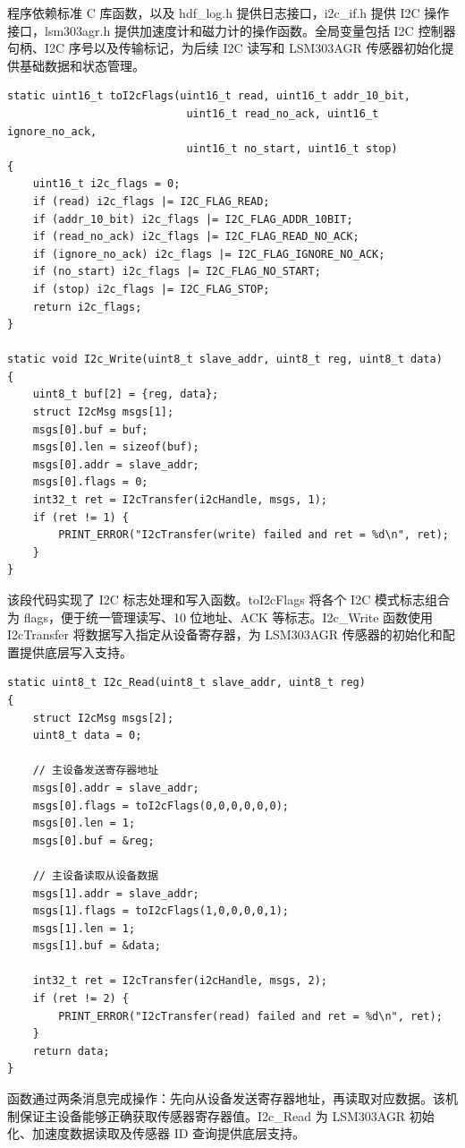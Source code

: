 程序依赖标准 C 库函数，以及 hdf_log.h 提供日志接口，i2c_if.h 提供 I2C 操作接口，lsm303agr.h 提供加速度计和磁力计的操作函数。全局变量包括 I2C 控制器句柄、I2C 序号以及传输标记，为后续 I2C 读写和 LSM303AGR 传感器初始化提供基础数据和状态管理。

\begin{lstlisting}
static uint16_t toI2cFlags(uint16_t read, uint16_t addr_10_bit,
                            uint16_t read_no_ack, uint16_t ignore_no_ack,
                            uint16_t no_start, uint16_t stop)
{
    uint16_t i2c_flags = 0;
    if (read) i2c_flags |= I2C_FLAG_READ;
    if (addr_10_bit) i2c_flags |= I2C_FLAG_ADDR_10BIT;
    if (read_no_ack) i2c_flags |= I2C_FLAG_READ_NO_ACK;
    if (ignore_no_ack) i2c_flags |= I2C_FLAG_IGNORE_NO_ACK;
    if (no_start) i2c_flags |= I2C_FLAG_NO_START;
    if (stop) i2c_flags |= I2C_FLAG_STOP;
    return i2c_flags;
}

static void I2c_Write(uint8_t slave_addr, uint8_t reg, uint8_t data)
{
    uint8_t buf[2] = {reg, data};
    struct I2cMsg msgs[1];
    msgs[0].buf = buf;
    msgs[0].len = sizeof(buf);
    msgs[0].addr = slave_addr;
    msgs[0].flags = 0;
    int32_t ret = I2cTransfer(i2cHandle, msgs, 1);
    if (ret != 1) {
        PRINT_ERROR("I2cTransfer(write) failed and ret = %d\n", ret);
    }
}
\end{lstlisting}

该段代码实现了 I2C 标志处理和写入函数。toI2cFlags 将各个 I2C 模式标志组合为 flags，便于统一管理读写、10 位地址、ACK 等标志。I2c_Write 函数使用 I2cTransfer 将数据写入指定从设备寄存器，为 LSM303AGR 传感器的初始化和配置提供底层写入支持。

\begin{lstlisting}
static uint8_t I2c_Read(uint8_t slave_addr, uint8_t reg)
{
    struct I2cMsg msgs[2];
    uint8_t data = 0;

    // 主设备发送寄存器地址
    msgs[0].addr = slave_addr;
    msgs[0].flags = toI2cFlags(0,0,0,0,0,0);
    msgs[0].len = 1;
    msgs[0].buf = &reg;

    // 主设备读取从设备数据
    msgs[1].addr = slave_addr;
    msgs[1].flags = toI2cFlags(1,0,0,0,0,1);
    msgs[1].len = 1;
    msgs[1].buf = &data;

    int32_t ret = I2cTransfer(i2cHandle, msgs, 2);
    if (ret != 2) {
        PRINT_ERROR("I2cTransfer(read) failed and ret = %d\n", ret);
    }
    return data;
}
\end{lstlisting}

函数通过两条消息完成操作：先向从设备发送寄存器地址，再读取对应数据。该机制保证主设备能够正确获取传感器寄存器值。I2c_Read 为 LSM303AGR 初始化、加速度数据读取及传感器 ID 查询提供底层支持。

